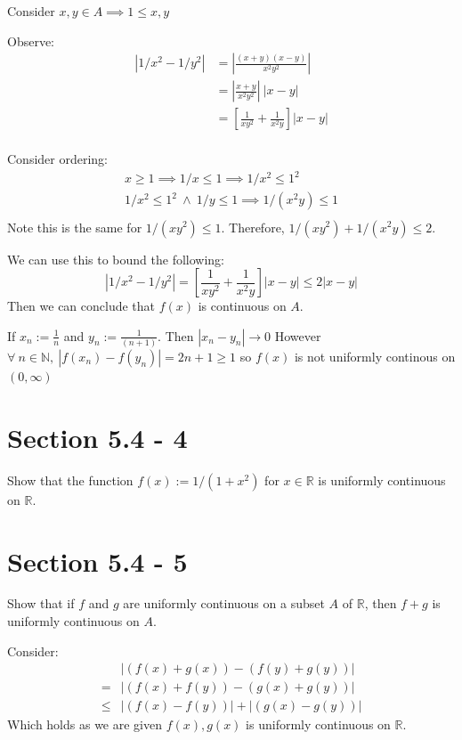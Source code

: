 Consider $x,y \in A \implies 1 \leq x,y$

Observe:
\[
\begin{align}
\left| 1/x^2 - 1/y^2 \right| & = \left| \frac{(x+y)(x-y)}{x^2y^2} \right| \\
& = \left| \frac{x+y}{x^2y^2} \right| ~\left| x-y \right| \\
& = \left[ \frac{1}{xy^2} + \frac{1}{x^2y} \right] \left| x-y \right| \\
\end{align}
\] 

Consider ordering:
\[
\begin{gathered}
x \geq 1 \implies 1/x \leq 1 \implies 1/x^2 \leq 1^2 \\
1/x^2 \leq 1^2  ~\land~ 1/y \leq 1 \implies 1/(x^2y) \leq 1\\
\end{gathered}
\] 
Note this is the same for $1/(xy^2) \leq 1$. Therefore, $1/(xy^2) + 1/(x^2y) \leq 2$.

We can use this to bound the following:
\[
\left| 1/x^2 - 1/y^2 \right| = \left[ \frac{1}{xy^2} + \frac{1}{x^2y} \right] \left| x-y \right| \leq 2 |x-y|
\] 
Then we can conclude that $f(x)$ is continuous on $A$.

If $x_n := \frac{1}{n}$ and $y_n := \frac{1}{(n+1)}$. Then $\left| x_n - y_n \right| \rightarrow 0$ However $\forall~ n \in \mathbb{N}, ~\left| f(x_n) - f(y_n) \right|=2n+1 \geq 1$ so $f(x)$ is not uniformly continous on $(0, \infty)$

\section{Section 5.4 - 4}
Show that the function $f(x) := 1/(1 + x^2)$ for $x \in \mathbb{R}$ is uniformly continuous on $\mathbb{R}$.


\section{Section 5.4 - 5}
Show that if $f$ and $g$ are uniformly continuous on a subset $A$ of $\mathbb{R}$, then $f + g$ is uniformly continuous on $A$.

Consider:
\[
\begin{align}
  & \left| \left( f(x) + g(x)  \right) - \left( f(y) + g(y) \right) \right| \\
= & \left| \left( f(x) + f(y)  \right) - \left( g(x) + g(y) \right) \right| \\
\leq &  \left| \left( f(x) - f(y)  \right) \right| + \left| \left( g(x) - g(y) \right) \right|
\end{align}
\] 
Which holds as we are given $f(x),g(x)$ is uniformly continuous on $\mathbb{R}$. 

